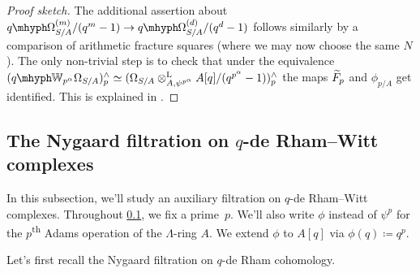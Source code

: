 \documentclass[DIV=12,numbers=enddot,leqno,bibliography=totoc]{scrartcl}
\begin{document}
\begin{proof}[Proof sketch]
		The additional assertion about $\qOmega_{S/A}^{(m)}/(q^m-1)\rightarrow \qOmega_{S/A}^{(d)}/(q^d-1)$ follows similarly by a comparison of arithmetic fracture squares (where we may now choose the same $N$). The only non-trivial step is to check that under the equivalence $(\qIW_{p^\alpha}\Omega_{S/A})_p^\complete\simeq (\Omega_{S/A}\lotimes_{A,\psi^{p^{\alpha}}}A[q]/(q^{p^\alpha}-1))_p^\complete$ the maps $\overtilde{F}_p$ and $\phi_{p/A}$ get identified. This is explained in \cite[Corollary~]{qWitt}.
	\end{proof}
	
	
	
	
	
	\subsection{The Nygaard filtration on \texorpdfstring{$q$}{q}-de Rham--Witt complexes}\label{subsec:Nygaard}
	In this subsection, we'll study an auxiliary filtration on $q$-de Rham--Witt complexes. Throughout \cref{subsec:Nygaard}, we fix a prime~$p$. We'll also write $\phi$ instead of $\psi^p$ for the $p$\textsuperscript{th} Adams operation of the $\Lambda$-ring $A$. We extend $\phi$ to $A[q]$ via $\phi(q)\coloneqq q^p$.
	
	Let's first recall the Nygaard filtration on $q$-de Rham cohomology.
	
\end{document}
